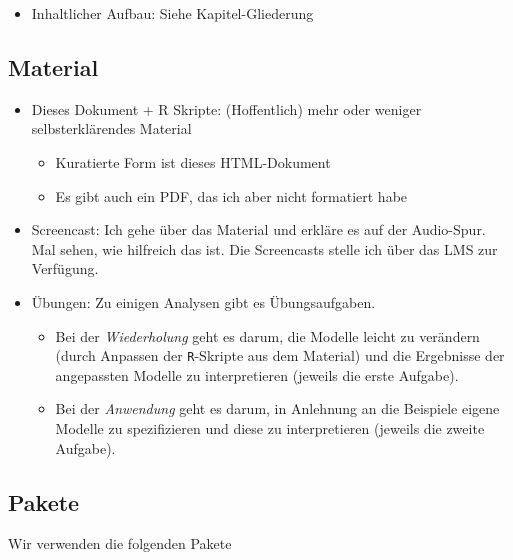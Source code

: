 \documentclass[
]{book}
\providecommand{\tightlist}{%
  \setlength{\itemsep}{0pt}\setlength{\parskip}{0pt}}
\begin{document}
\begin{itemize}
\tightlist
\item
  Inhaltlicher Aufbau: Siehe Kapitel-Gliederung
\end{itemize}

\hypertarget{material}{%
\subsection*{Material}\label{material}}

\begin{itemize}
\item
  Dieses Dokument + R Skripte: (Hoffentlich) mehr oder weniger selbsterklärendes Material

  \begin{itemize}
  \tightlist
  \item
    Kuratierte Form ist dieses HTML-Dokument
  \item
    Es gibt auch ein PDF, das ich aber nicht formatiert habe
  \end{itemize}
\item
  Screencast: Ich gehe über das Material und erkläre es auf der Audio-Spur. Mal sehen, wie hilfreich das ist. Die Screencasts stelle ich über das LMS zur Verfügung.
\item
  Übungen: Zu einigen Analysen gibt es Übungsaufgaben.

  \begin{itemize}
  \tightlist
  \item
    Bei der \emph{Wiederholung} geht es darum, die Modelle leicht zu verändern (durch Anpassen der \texttt{R}-Skripte aus dem Material) und die Ergebnisse der angepassten Modelle zu interpretieren (jeweils die erste Aufgabe).
  \item
    Bei der \emph{Anwendung} geht es darum, in Anlehnung an die Beispiele eigene Modelle zu spezifizieren und diese zu interpretieren (jeweils die zweite Aufgabe).
  \end{itemize}
\end{itemize}

\hypertarget{pakete}{%
\subsection*{Pakete}\label{pakete}}

Wir verwenden die folgenden Pakete
\end{document}
